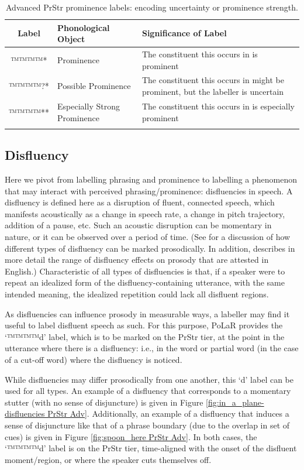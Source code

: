 \documentclass[11pt, twoside]{memoir}
\begin{document}
\begin{longtable}{clp{.5\linewidth}} \toprule \textbf{Label} & \textbf{Phonological Object} & \textbf{Significance of Label}\tabularnewline
\midrule \endhead
\rowcolor{green}
™™™™{*} & Prominence & The constituent this occurs in is prominent\tabularnewline
™™™™{?*} & Possible Prominence & The constituent this occurs in might be prominent, but the labeller is uncertain \tabularnewline
™™™™{**} & Especially Strong Prominence & The constituent this occurs in is especially prominent \tabularnewline
\bottomrule
\caption{Advanced PrStr prominence labels: encoding uncertainty or prominence strength.}
\end{longtable}

\subsection{Disfluency}\label{sec:disfluency}

Here we pivot from labelling phrasing and prominence to labelling a phenomenon that may interact with perceived phrasing\slash prominence: disfluencies in speech. A disfluency is defined here as a disruption of fluent, connected speech, which manifests acoustically as a change in speech rate, a change in pitch trajectory, addition of a pause, etc. Such an acoustic disruption can be momentary in nature, or it can be observed over a period of time. (See \citealt{shattuck-hufnagelcutler99} for a discussion of how different types of disfluency can be marked prosodically. In addition, \citealt{brugos-19} describes in more detail the range of disfluency effects on prosody that are attested in English.) Characteristic of all types of disfluencies is that, if a speaker were to repeat an idealized form of the disfluency-containing utterance, with the same intended meaning, the idealized repetition could lack all disfluent regions.

As disfluencies can influence prosody in measurable ways, a labeller may find it useful to label disfluent speech as such. For this purpose, PoLaR provides the ‘™™™™{d}’ label, which is to be marked on the PrStr tier, at the point in the utterance where there is a disfluency: i.e., in the word or partial word (in the case of a cut-off word) where the disfluency is noticed.

While disfluencies may differ prosodically from one another, this ‘d’ label can be used for all types. An example of a disfluency that corresponds to a momentary stutter (with no sense of disjuncture) is given in Figure \ref{fig:in_a_plane-disfluencies PrStr Adv}. Additionally, an example of a disfluency that induces a sense of disjuncture like that of a phrase boundary (due to the overlap in set of cues) is given in Figure \ref{fig:spoon_here PrStr Adv}. In both cases, the ‘™™™™{d}’ label is on the PrStr tier, time-aligned with the onset of the disfluent moment\slash region, or where the speaker cuts themselves off.
\end{document}
